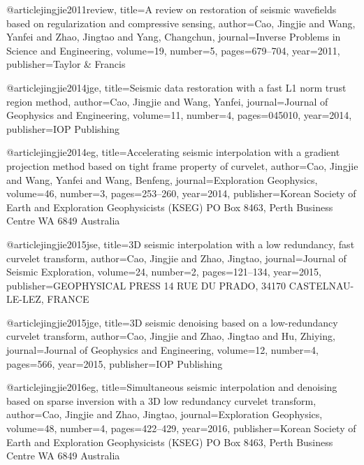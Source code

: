 @article{jingjie2011review,
  title={A review on restoration of seismic wavefields based on regularization and compressive sensing},
  author={Cao, Jingjie and Wang, Yanfei and Zhao, Jingtao and Yang, Changchun},
  journal={Inverse Problems in Science and Engineering},
  volume={19},
  number={5},
  pages={679--704},
  year={2011},
  publisher={Taylor \& Francis}
}

@article{jingjie2014jge,
  title={Seismic data restoration with a fast L1 norm trust region method},
  author={Cao, Jingjie and Wang, Yanfei},
  journal={Journal of Geophysics and Engineering},
  volume={11},
  number={4},
  pages={045010},
  year={2014},
  publisher={IOP Publishing}
}

@article{jingjie2014eg,
  title={Accelerating seismic interpolation with a gradient projection method based on tight frame property of curvelet},
  author={Cao, Jingjie and Wang, Yanfei and Wang, Benfeng},
  journal={Exploration Geophysics},
  volume={46},
  number={3},
  pages={253--260},
  year={2014},
  publisher={Korean Society of Earth and Exploration Geophysicists (KSEG) PO Box 8463, Perth Business Centre WA 6849 Australia}
}

@article{jingjie2015jse,
  title={3{D} seismic interpolation with a low redundancy, fast curvelet transform},
  author={Cao, Jingjie and Zhao, Jingtao},
  journal={Journal of Seismic Exploration},
  volume={24},
  number={2},
  pages={121--134},
  year={2015},
  publisher={GEOPHYSICAL PRESS 14 RUE DU PRADO, 34170 CASTELNAU-LE-LEZ, FRANCE}
}

@article{jingjie2015jge,
  title={3{D} seismic denoising based on a low-redundancy curvelet transform},
  author={Cao, Jingjie and Zhao, Jingtao and Hu, Zhiying},
  journal={Journal of Geophysics and Engineering},
  volume={12},
  number={4},
  pages={566},
  year={2015},
  publisher={IOP Publishing}
}

@article{jingjie2016eg,
  title={Simultaneous seismic interpolation and denoising based on sparse inversion with a 3{D} low redundancy curvelet transform},
  author={Cao, Jingjie and Zhao, Jingtao},
  journal={Exploration Geophysics},
  volume={48},
  number={4},
  pages={422--429},
  year={2016},
  publisher={Korean Society of Earth and Exploration Geophysicists (KSEG) PO Box 8463, Perth Business Centre WA 6849 Australia}
}













